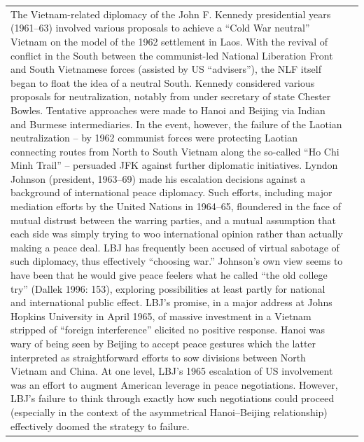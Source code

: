 {\begin{longtable}{p{}p{}}
The Vietnam-related diplomacy of the John F. Kennedy presidential years (1961–63) involved various proposals to achieve a “Cold War neutral” Vietnam on the model of the 1962 settlement in Laos. With the revival of conflict in the South between the communist-led National Liberation Front and South Vietnamese forces (assisted by US “advisers”), the NLF itself began to float the idea of a neutral South. Kennedy considered various proposals for neutralization, notably from under secretary of state Chester Bowles. Tentative approaches were made to Hanoi and Beijing via Indian and Burmese intermediaries. In the event, however, the failure of the Laotian neutralization – by 1962 communist forces were protecting Laotian connecting routes from North to South Vietnam along the so-called “Ho Chi Minh Trail” – persuaded JFK against further diplomatic initiatives. 
Lyndon Johnson (president, 1963–69) made his escalation decisions against a background of international peace diplomacy. Such efforts, including major mediation efforts by the United Nations in 1964–65, floundered in the face of mutual distrust between the warring parties, and a mutual assumption that each side was simply trying to woo international opinion rather than actually making a peace deal. LBJ has frequently been accused of virtual sabotage of such diplomacy, thus effectively “choosing war.” Johnson's own view seems to have been that he would give peace feelers what he called “the old college try” (Dallek 1996: 153), exploring possibilities at least partly for national and international public effect. LBJ's promise, in a major address at Johns Hopkins University in April 1965, of massive investment in a Vietnam stripped of “foreign interference” elicited no positive response. Hanoi was wary of being seen by Beijing to accept peace gestures which the latter interpreted as straightforward efforts to sow divisions between North Vietnam and China. At one level, LBJ's 1965 escalation of US involvement was an effort to augment American leverage in peace negotiations. However, LBJ's failure to think through exactly how such negotiations could proceed (especially in the context of the asymmetrical Hanoi–Beijing relationship) effectively doomed the strategy to failure.
\\

\end{longtable}}
